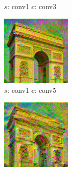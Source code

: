 \documentclass[12pt]{beamer}
\begin{document}
\begin{frame}
\begin{figure}[H]
\begin{subfigure}[b]{0.2\textwidth}
                \caption{$s$: conv1 $c$: conv3}
            \end{subfigure}
            \hfill
            \begin{subfigure}[b]{0.2\textwidth}
                \centering
                \includegraphics[width=\textwidth]{resources/gatys/layers/conv1_conv5.png}
                \caption{$s$: conv1 $c$: conv5}
            \end{subfigure}
            \hfill
            \begin{subfigure}[b]{0.2\textwidth}
                \centering
                \includegraphics[width=\textwidth]{resources/gatys/layers/conv1_conv9.png}

\end{subfigure}
\end{figure}
\end{frame}
\end{document}
